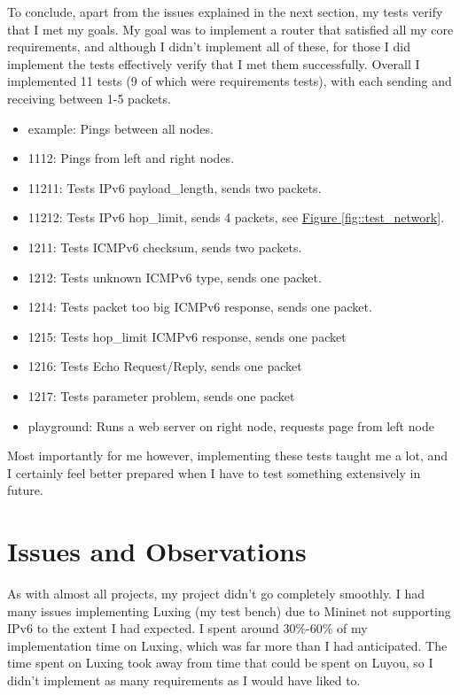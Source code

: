\documentclass[12pt,a4paper,twoside,openany]{report}
\begin{document}
\bigskip

To conclude, apart from the issues explained in the next section, my tests verify that I met my goals.  My goal was to implement a router that satisfied all my core requirements, and although I didn't implement all of these, for those I did implement the tests effectively verify that I met them successfully.  Overall I implemented 11 tests (9 of which were requirements tests), with each sending and receiving between 1-5 packets. 
\begin{itemize}
\item example: Pings between all nodes.
\item 1112: Pings from left and right nodes.
\item 11211: Tests IPv6 payload\_length, sends two packets.
\item 11212: Tests IPv6 hop\_limit, sends 4 packets, see \hyperref[fig::test_success]{Figure }\ref{fig::test_network}.
\item 1211: Tests ICMPv6 checksum, sends two packets.
\item 1212: Tests unknown ICMPv6 type, sends one packet.
\item 1214: Tests packet too big ICMPv6 response, sends one packet.
\item 1215: Tests hop\_limit ICMPv6 response, sends one packet
\item 1216: Tests Echo Request/Reply, sends one packet
\item 1217: Tests parameter problem, sends one packet
\item playground: Runs a web server on right node, requests page from left node
\end{itemize}
Most importantly for me however, implementing these tests taught me a lot, and I certainly feel better prepared when I have to test something extensively in future.

\section{Issues and Observations}

As with almost all projects, my project didn't go completely smoothly. I had many issues implementing Luxing (my test bench) due to Mininet not supporting IPv6 to the extent I had expected. I spent around 30\%-60\% of my implementation time on Luxing, which was far more than I had anticipated. The time spent on Luxing took away from time that could be spent on Luyou, so I didn't implement as many requirements as I would have liked to.
\end{document}
